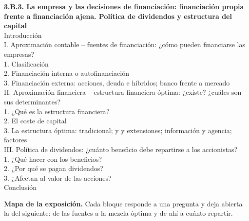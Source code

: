 \documentclass[11pt]{article}
\begin{document}
\begin{esquema}
\textbf{3.B.3. La empresa y las decisiones de financiación: financiación propia frente a financiación ajena. Política de dividendos y estructura del capital}\\[2pt]
Introducción\\
I. Aproximación contable – fuentes de financiación: ¿cómo pueden financiarse las empresas?\\
\hspace*{1.5em}1. Clasificación\\
\hspace*{1.5em}2. Financiación interna o autofinanciación\\
\hspace*{1.5em}3. Financiación externa: acciones, deuda e híbridos; banco frente a mercado\\
II. Aproximación financiera – estructura financiera óptima: ¿existe? ¿cuáles son sus determinantes?\\
\hspace*{1.5em}1. ¿Qué es la estructura financiera?\\
\hspace*{1.5em}2. El coste de capital\\
\hspace*{1.5em}3. La estructura óptima: tradicional;  y  y extensiones; información y agencia; factores\\
III. Política de dividendos: ¿cuánto beneficio debe repartirse a los accionistas?\\
\hspace*{1.5em}1. ¿Qué hacer con los beneficios?\\
\hspace*{1.5em}2. ¿Por qué se pagan dividendos?\\
\hspace*{1.5em}3. ¿Afectan al valor de las acciones?\\
Conclusión
\end{esquema}

\begin{anotaciones}
\textbf{Mapa de la exposición.} Cada bloque responde a una pregunta y deja abierta la del siguiente: de las fuentes a la mezcla óptima y de ahí a cuánto repartir.
\begin{infografiacaja}
\caption{Mapa del tema: la pregunta de cada bloque, sus subapartados y el hilo que los une}\label{figu:mapa-tema}
\end{infografiacaja}
\end{anotaciones}
\end{document}
